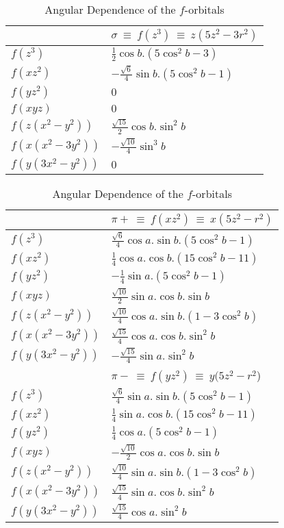 \begin{table}
\caption{\label{f_rot1} Angular Dependence of the $f$-orbitals}
\begin{tabular}{|l|l|} \hline
 & $\sigma \ \equiv \ f(z^3) \ \equiv \ z(5z^2-3r^2)$ \\ \hline
$f(z^3)$ & $\frac{1}{2}\cos b . (5\cos^2b -3)$ \\
$f(xz^2)$ & $-\frac{\sqrt{6}}{4}\sin b.(5\cos^2b-1)$ \\
$f(yz^2)$ & $0$ \\
$f(xyz)$ & $0$ \\
$f(z(x^2-y^2))$ & $\frac{\sqrt{15}}{2}\cos b.\sin^2b$ \\
$ f(x(x^2-3y^2))$ & $-\frac{\sqrt{10}}{4}\sin^3b$ \\
$f(y(3x^2-y^2))$ & $0$ \\ \hline
\end{tabular}

\begin{tabular}{|l|l|} \hline
 & $\pi + \ \equiv \  f(xz^2) \ \equiv \ x(5z^2-r^2)$ \\ \hline
$f(z^3)$ & $\frac{\sqrt{6}}{4}\cos a.\sin b.(5\cos^2b-1)$ \\
$f(xz^2)$ & $\frac{1}{4}\cos a.\cos b.(15\cos^2b-11)$ \\
$f(yz^2)$ & $-\frac{1}{4}\sin a.(5\cos^2b-1)$ \\
$f(xyz)$ & $\frac{\sqrt{10}}{2}\sin a.\cos b.\sin b$ \\
$f(z(x^2-y^2))$ & $\frac{\sqrt{10}}{4}\cos a.\sin b.(1-3\cos^2b)$ \\
$f(x(x^2-3y^2))$ & $\frac{\sqrt{15}}{4}\cos a.\cos b.\sin^2b$ \\
$f(y(3x^2-y^2))$ & $-\frac{\sqrt{15}}{4}\sin a.\sin^2b$ \\ \hline
 & $\pi - \ \equiv \ f(yz^2)  \ \equiv \ y(5z^2-r^2$)\\ \hline
$f(z^3)$ & $\frac{\sqrt{6}}{4}\sin a.\sin b.(5\cos^2b-1)$ \\
$f(xz^2)$ & $\frac{1}{4}\sin a.\cos b.(15\cos^2b-11)$ \\
$f(yz^2)$ & $\frac{1}{4}\cos a.(5\cos^2b-1)$ \\
$f(xyz)$ & $-\frac{\sqrt{10}}{2}\cos a.\cos b.\sin b$ \\
$f(z(x^2-y^2))$ & $\frac{\sqrt{10}}{4}\sin a.\sin b.(1-3\cos^2b)$ \\
$f(x(x^2-3y^2))$ & $\frac{\sqrt{15}}{4}\sin a.\cos b.\sin^2b$ \\
$f(y(3x^2-y^2))$ & $\frac{\sqrt{15}}{4}\cos a.\sin^2b$ \\ \hline
\end{tabular}
\end{table}

